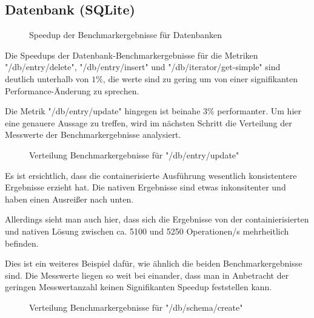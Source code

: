 \subsection{Datenbank (SQLite)}

\begin{figure}[H]
    \centering
    
    \caption{Speedup der Benchmarkergebnisse für Datenbanken}
    \label{fig:speedup_db}
\end{figure}

\FloatBarrier

Die Speedups der Datenbank-Benchmarkergebnisse für die Metriken "/db/entry/delete", "/db/entry/insert" und "/db/iterator/get-simple" sind deutlich unterhalb von $1\%$, die werte sind zu gering um von einer signifikanten Performance-Änderung zu sprechen. 

Die Metrik "/db/entry/update" hingegen ist beinahe $3\%$ performanter. Um hier eine genauere Aussage zu treffen, wird im nächsten Schritt die Verteilung der Messwerte der Benchmarkergebnisse analysiert.

\begin{figure}[H]
    \centering
    
    \caption{Verteilung Benchmarkergebnisse für "/db/entry/update"}
    \label{fig:mdist_db_entry_update}
\end{figure}

\FloatBarrier

Es ist ersichtlich, dass die containerisierte Ausführung wesentlich konsistentere Ergebnisse erzieht hat. 
Die nativen Ergebnisse sind etwas inkonsitenter und haben einen Ausreißer nach unten. 

Allerdings sieht man auch hier, dass sich die Ergebnisse von der containierisierten und nativen Lösung zwischen ca. 5100 und 5250 Operationen/s mehrheitlich befinden. 

Dies ist ein weiteres Beispiel dafür, wie ähnlich die beiden Benchmarkergebnisse sind. Die Messwerte liegen so weit bei einander, dass man in Anbetracht der geringen Messwertanzahl keinen Signifikanten Speedup feststellen kann.

\begin{figure}[H]
    \centering
    
    \caption{Verteilung Benchmarkergebnisse für "/db/schema/create"}
    \label{fig:mdist_db_schema_create}
\end{figure}

